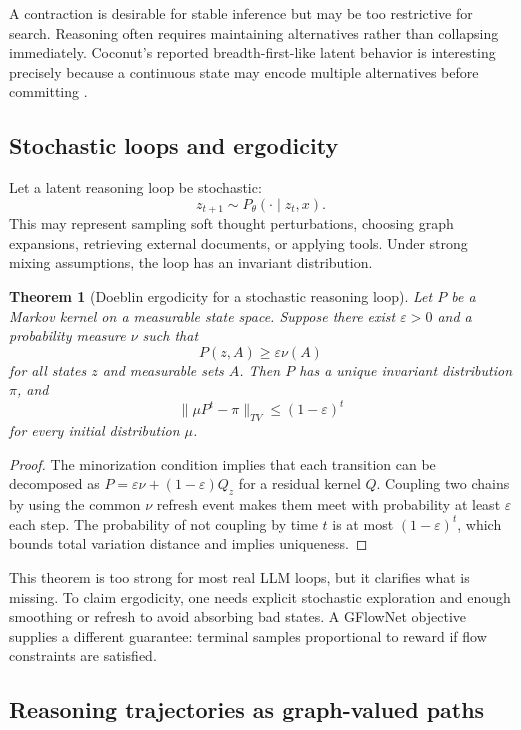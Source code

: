 \documentclass[11pt]{article}
\newtheorem{theorem}[definition]{Theorem}
\newcommand{\1}{\mathbf{1}}
\newcommand{\eps}{\varepsilon}
\begin{document}
A contraction is desirable for stable inference but may be too restrictive for search. Reasoning often requires maintaining alternatives rather than collapsing immediately. Coconut's reported breadth-first-like latent behavior is interesting precisely because a continuous state may encode multiple alternatives before committing \cite{Hao2024}.

\subsection{Stochastic loops and ergodicity}

Let a latent reasoning loop be stochastic:
\[
z_{t+1}\sim P_\theta(\cdot\mid z_t,x).
\]
This may represent sampling soft thought perturbations, choosing graph expansions, retrieving external documents, or applying tools. Under strong mixing assumptions, the loop has an invariant distribution.

\begin{theorem}[Doeblin ergodicity for a stochastic reasoning loop]
Let $P$ be a Markov kernel on a measurable state space. Suppose there exist $\eps>0$ and a probability measure $\nu$ such that
\[
P(z,A)\ge \eps\nu(A)
\]
for all states $z$ and measurable sets $A$. Then $P$ has a unique invariant distribution $\pi$, and
\[
\|\mu P^t-\pi\|_{TV}\le (1-\eps)^t
\]
for every initial distribution $\mu$.
\end{theorem}
\begin{proof}
The minorization condition implies that each transition can be decomposed as $P=\eps \nu +(1-\eps)Q_z$ for a residual kernel $Q$. Coupling two chains by using the common $\nu$ refresh event makes them meet with probability at least $\eps$ each step. The probability of not coupling by time $t$ is at most $(1-\eps)^t$, which bounds total variation distance and implies uniqueness.
\end{proof}

This theorem is too strong for most real LLM loops, but it clarifies what is missing. To claim ergodicity, one needs explicit stochastic exploration and enough smoothing or refresh to avoid absorbing bad states. A GFlowNet objective supplies a different guarantee: terminal samples proportional to reward if flow constraints are satisfied.

\subsection{Reasoning trajectories as graph-valued paths}
\end{document}
